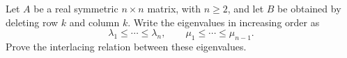 Let $A$ be a real symmetric $n\times n$ matrix, with $n\ge2$, and let $B$ be obtained by deleting row $k$ and column $k$. Write the eigenvalues in increasing order as
\[
 \lambda_1\le\cdots\le\lambda_n,
 \qquad \mu_1\le\cdots\le\mu_{n-1}.
\]
Prove the interlacing relation between these eigenvalues.
